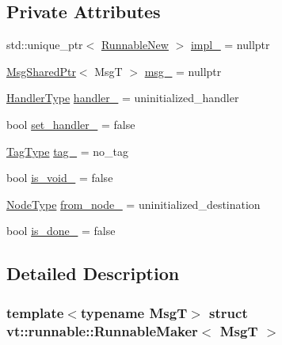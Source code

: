 \subsection*{Private Attributes}
\begin{DoxyCompactItemize}
\item 
std\+::unique\+\_\+ptr$<$ \hyperlink{structvt_1_1runnable_1_1_runnable_new}{Runnable\+New} $>$ \hyperlink{structvt_1_1runnable_1_1_runnable_maker_ae7075cf590020886a7e7319a13d4b4c5}{impl\+\_\+} = nullptr
\item 
\hyperlink{namespacevt_ab2b3d506ec8e8d1540aede826d84a239}{Msg\+Shared\+Ptr}$<$ MsgT $>$ \hyperlink{structvt_1_1runnable_1_1_runnable_maker_aa8d73c577b47287104b9d87e4228ed37}{msg\+\_\+} = nullptr
\item 
\hyperlink{namespacevt_af64846b57dfcaf104da3ef6967917573}{Handler\+Type} \hyperlink{structvt_1_1runnable_1_1_runnable_maker_a627ad83f0608f9b91c5ecedecf2f8d75}{handler\+\_\+} = uninitialized\+\_\+handler
\item 
bool \hyperlink{structvt_1_1runnable_1_1_runnable_maker_a52fd27acc3c3259743fdd7aed09d690d}{set\+\_\+handler\+\_\+} = false
\item 
\hyperlink{namespacevt_a84ab281dae04a52a4b243d6bf62d0e52}{Tag\+Type} \hyperlink{structvt_1_1runnable_1_1_runnable_maker_a5d76922354a61ff8d94eb734960fb64b}{tag\+\_\+} = no\+\_\+tag
\item 
bool \hyperlink{structvt_1_1runnable_1_1_runnable_maker_a5a50a669e9bf0a147fdeb2a482554304}{is\+\_\+void\+\_\+} = false
\item 
\hyperlink{namespacevt_a866da9d0efc19c0a1ce79e9e492f47e2}{Node\+Type} \hyperlink{structvt_1_1runnable_1_1_runnable_maker_ad053690f0793a709289f3c1d240a2851}{from\+\_\+node\+\_\+} = uninitialized\+\_\+destination
\item 
bool \hyperlink{structvt_1_1runnable_1_1_runnable_maker_a1a09d169753ee4c91ba1b42c291038f0}{is\+\_\+done\+\_\+} = false
\end{DoxyCompactItemize}


\subsection{Detailed Description}
\subsubsection*{template$<$typename MsgT$>$\newline
struct vt\+::runnable\+::\+Runnable\+Maker$<$ Msg\+T $>$}

